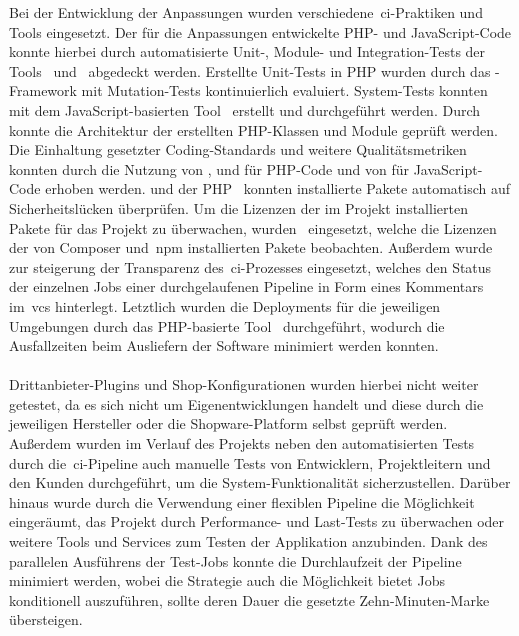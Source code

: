 Bei der Entwicklung der Anpassungen wurden verschiedene\ \acrshort{ci}-Praktiken und Tools eingesetzt.
Der für die Anpassungen entwickelte PHP- und JavaScript-Code konnte hierbei durch automatisierte Unit-, Module- und
Integration-Tests der Tools\  und\  abgedeckt werden.
Erstellte Unit-Tests in PHP wurden durch das -Framework mit Mutation-Tests kontinuierlich
evaluiert.
System-Tests konnten mit dem JavaScript-basierten Tool\  erstellt und durchgeführt werden.
Durch\  konnte die Architektur der erstellten PHP-Klassen und Module geprüft werden.
Die Einhaltung gesetzter Coding-Standards und weitere Qualitätsmetriken konnten durch die Nutzung von
,  und  für PHP-Code und von  für
JavaScript-Code erhoben werden.
 und der PHP\  konnten installierte Pakete automatisch auf
Sicherheitslücken überprüfen.
Um die Lizenzen der im Projekt installierten Pakete für das Projekt zu überwachen, wurden\ 
eingesetzt, welche die Lizenzen der von Composer und\ \acrshort{npm} installierten Pakete beobachten.
Außerdem wurde\  zur steigerung der Transparenz des\ \acrshort{ci}-Prozesses eingesetzt, welches
den Status der einzelnen Jobs einer durchgelaufenen Pipeline in Form eines Kommentars im\ \acrshort{vcs} hinterlegt.
Letztlich wurden die Deployments für die jeweiligen Umgebungen durch das PHP-basierte Tool\ 
durchgeführt, wodurch die Ausfallzeiten beim Ausliefern der Software minimiert werden konnten.
\\\\
Drittanbieter-Plugins und Shop-Konfigurationen wurden hierbei nicht weiter getestet, da es sich nicht um
Eigenentwicklungen handelt und diese durch die jeweiligen Hersteller oder die Shopware-Platform selbst geprüft werden.
Außerdem wurden im Verlauf des Projekts neben den automatisierten Tests durch die\ \acrshort{ci}-Pipeline auch
manuelle Tests von Entwicklern, Projektleitern und den Kunden durchgeführt, um die System-Funktionalität
sicherzustellen.
Darüber hinaus wurde durch die Verwendung einer flexiblen Pipeline die Möglichkeit eingeräumt, das Projekt durch
Performance- und Last-Tests zu überwachen oder weitere Tools und Services zum Testen der Applikation anzubinden.
Dank des parallelen Ausführens der Test-Jobs konnte die Durchlaufzeit der Pipeline minimiert werden, wobei die
Strategie auch die Möglichkeit bietet Jobs konditionell auszuführen, sollte deren Dauer die gesetzte Zehn-Minuten-Marke
übersteigen.

\clearpage
